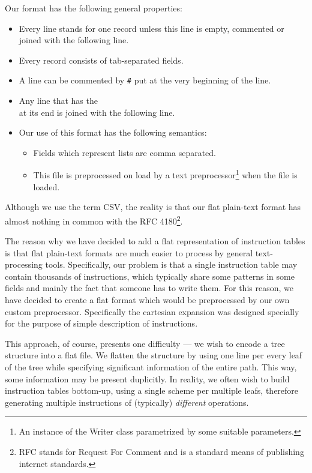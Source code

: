 Our format has the following general properties:
\begin{itemize}
  \item Every line stands for one record unless this line is empty, commented or joined with the following line.
  \item Every record consists of tab-separated fields.
  \item A line can be commented by \texttt{\#} put at the very beginning of the line.
  \item Any line that has the \texttt{\\} at its end is joined with the following line.
  \item Our use of this format has the following semantics:
  \begin{itemize}
	\item Fields which represent lists are comma separated.
	\item This file is preprocessed on load by a text preprocessor\footnote{An instance of the Writer class parametrized by some suitable parameters.} when the file is loaded.
  \end{itemize}
\end{itemize}

Although we use the term CSV, the reality is that our flat plain-text format has almost nothing in common with the RFC 4180\footnote{RFC stands for Request For Comment and is a standard means of publishing internet standards.}.

The reason why we have decided to add a flat representation of instruction tables is that flat plain-text formats are much easier to process by general text-processing tools. Specifically, our problem is that a single instruction table may contain thousands of instructions, which typically share some patterns in some fields and mainly the fact that someone has to write them. For this reason, we have decided to create a flat format which would be preprocessed by our own custom preprocessor. Specifically the cartesian expansion was designed specially for the purpose of simple description of instructions.

This approach, of course, presents one difficulty --- we wish to encode a tree structure into a flat file. We flatten the structure by using one line per every leaf of the tree while specifying significant information of the entire path. This way, some information may be present duplicitly. In reality, we often wish to build instruction tables bottom-up, using a single scheme per multiple leafs, therefore generating multiple instructions of (typically) \emph{different} operations. 

